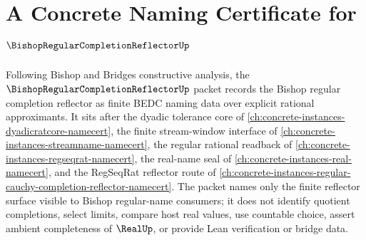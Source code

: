\chapter{A Concrete Naming Certificate for $\BishopRegularCompletionReflectorUp$}
\label{ch:concrete-instances-bishop-regular-completion-reflector-namecert}

Following Bishop and Bridges constructive analysis, the $\BishopRegularCompletionReflectorUp$ packet records the Bishop regular completion reflector as finite BEDC naming data over explicit rational approximants. It sits after the dyadic tolerance core of \autoref{ch:concrete-instances-dyadicratcore-namecert}, the finite stream-window interface of \autoref{ch:concrete-instances-streamname-namecert}, the regular rational readback of \autoref{ch:concrete-instances-regseqrat-namecert}, the real-name seal of \autoref{ch:concrete-instances-real-namecert}, and the RegSeqRat reflector route of \autoref{ch:concrete-instances-regular-cauchy-completion-reflector-namecert}. The packet names only the finite reflector surface visible to Bishop regular-name consumers; it does not identify quotient completions, select limits, compare host real values, use countable choice, assert ambient completeness of $\RealUp$, or provide Lean verification or bridge data.

